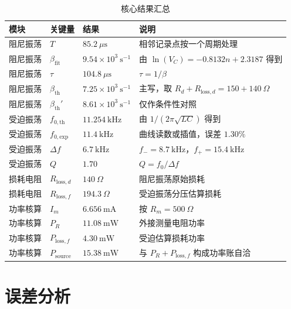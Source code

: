 ﻿\documentclass[UTF8,12pt,a4paper]{ctexart}
\numberwithin{equation}{section}
\begin{document}
\begin{table}[H]
\centering
\caption{核心结果汇总}
\label{tab:summary}
\small
\begin{tabularx}{\textwidth}{>{\centering\arraybackslash}p{2.2cm} >{\centering\arraybackslash}p{3.2cm} >{\raggedleft\arraybackslash}p{3.2cm} Y}
\toprule
模块 & 关键量 & 结果 & 说明 \\
\midrule
阻尼振荡 & \(T\) & \(85.2\ \mu\mathrm{s}\) & 相邻记录点按一个周期处理 \\
阻尼振荡 & \(\beta_{\mathrm{fit}}\) & \(9.54\times10^3\ \mathrm{s^{-1}}\) & 由 \(\ln(V_C)=-0.8132n+2.3187\) 得到 \\
阻尼振荡 & \(\tau\) & \(104.8\ \mu\mathrm{s}\) & \(\tau=1/\beta\) \\
阻尼振荡 & \(\beta_{\mathrm{th}}\) & \(7.25\times10^3\ \mathrm{s^{-1}}\) & 主写，取 \(R_d+R_{\mathrm{loss},d}=150+140\ \Omega\) \\
阻尼振荡 & \(\beta_{\mathrm{th}}'\) & \(8.61\times10^3\ \mathrm{s^{-1}}\) & 仅作条件性对照 \\
受迫振荡 & \(f_{0,\mathrm{th}}\) & \(11.254\ \mathrm{kHz}\) & 由 \(1/(2\pi\sqrt{LC})\) 得到 \\
受迫振荡 & \(f_{0,\mathrm{exp}}\) & \(11.4\ \mathrm{kHz}\) & 曲线读数或插值，误差 \(1.30\%\) \\
受迫振荡 & \(\Delta f\) & \(6.7\ \mathrm{kHz}\) & \(f_-=8.7\ \mathrm{kHz}\)，\(f_+=15.4\ \mathrm{kHz}\) \\
受迫振荡 & \(Q\) & \(1.70\) & \(Q=f_0/\Delta f\) \\
损耗电阻 & \(R_{\mathrm{loss},d}\) & \(140\ \Omega\) & 阻尼振荡原始损耗 \\
损耗电阻 & \(R_{\mathrm{loss},f}\) & \(194.3\ \Omega\) & 受迫振荡分压估算损耗 \\
功率核算 & \(I_m\) & \(6.656\ \mathrm{mA}\) & 按 \(R_m=500\ \Omega\) \\
功率核算 & \(P_R\) & \(11.08\ \mathrm{mW}\) & 外接测量电阻功率 \\
功率核算 & \(P_{\mathrm{loss},f}\) & \(4.30\ \mathrm{mW}\) & 受迫估算损耗功率 \\
功率核算 & \(P_{\mathrm{source}}\) & \(15.38\ \mathrm{mW}\) & 与 \(P_R+P_{\mathrm{loss},f}\) 构成功率账自洽 \\
\bottomrule
\end{tabularx}
\end{table}

\section{误差分析}
\end{document}
